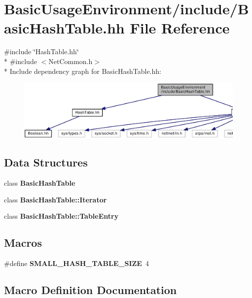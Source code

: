 \section{Basic\+Usage\+Environment/include/\+Basic\+Hash\+Table.hh File Reference}
\label{BasicHashTable_8hh}
{\ttfamily \#include \char`\"{}Hash\+Table.\+hh\char`\"{}}\\*
{\ttfamily \#include $<$Net\+Common.\+h$>$}\\*
Include dependency graph for Basic\+Hash\+Table.\+hh\+:
\nopagebreak
\begin{figure}[H]
\begin{center}
\leavevmode
\includegraphics[width=350pt]{BasicHashTable_8hh__incl}
\end{center}
\end{figure}
\subsection*{Data Structures}
\begin{DoxyCompactItemize}
\item 
class {\bf Basic\+Hash\+Table}
\item 
class {\bf Basic\+Hash\+Table\+::\+Iterator}
\item 
class {\bf Basic\+Hash\+Table\+::\+Table\+Entry}
\end{DoxyCompactItemize}
\subsection*{Macros}
\begin{DoxyCompactItemize}
\item 
\#define {\bf S\+M\+A\+L\+L\+\_\+\+H\+A\+S\+H\+\_\+\+T\+A\+B\+L\+E\+\_\+\+S\+I\+Z\+E}~4
\end{DoxyCompactItemize}


\subsection{Macro Definition Documentation}
